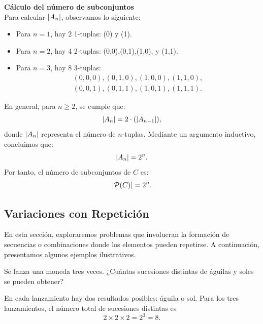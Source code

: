 \documentclass[12pt,a4paper]{book}
\begin{document}
    \textbf{Cálculo del número de subconjuntos}\\
    Para calcular $\abs{A_{n}}$, observamos lo siguiente:
    \begin{itemize}
        \item Para $n=1$, hay 2 1-tuplas: (0) y (1).
        \item Para $n=2$, hay 4 2-tuplas: (0,0),(0,1),(1,0), y (1,1).
        \item Para $n=3$, hay 8 3-tuplas:
        \begin{align*}
            (0,0,0),(0,1,0),(1,0,0),(1,1,0),\\
            (0,0,1),(0,1,1),(1,0,1),(1,1,1).
        \end{align*}
    \end{itemize}
    En general, para $n\geq2$, se cumple que:
    \begin{align*}
        \abs{A_{n}}=2\cdot(\abs{A_{n-1}}),
    \end{align*}
    donde $\abs{A_{n}}$ representa el número de $n$-tuplas. Mediante un argumento inductivo,
    concluimos que:
    \begin{equation*}
        \abs{A_{n}}=2^{n}.
    \end{equation*}
    Por tanto, el número de subconjuntos de $C$ es:
    \begin{equation*}
        \abs{\mathcal{P}(C)}=2^{n}.
    \end{equation*}

    \subsection{Variaciones con Repetición}

    
    En esta sección, exploraremos problemas que involucran la formación de secuencias o combinaciones donde los elementos pueden repetirse. A continuación, presentamos algunos ejemplos ilustrativos.

    \begin{mdframed}[style=mdgraybox,frametitle={Problema 10: Lanzamiento de una moneda}]
        Se lanza una moneda tres veces. ¿Cuántas sucesiones distintas de águilas y soles se pueden obtener?
    \end{mdframed}

    \begin{solucion}
        En cada lanzamiento hay dos resultados posibles: águila o sol. Para los tres lanzamientos, el número total de sucesiones distintas es
        \begin{equation*}
            2\times2\times2=2^{3}=8.
        \end{equation*}
    \end{solucion}
\end{document}

